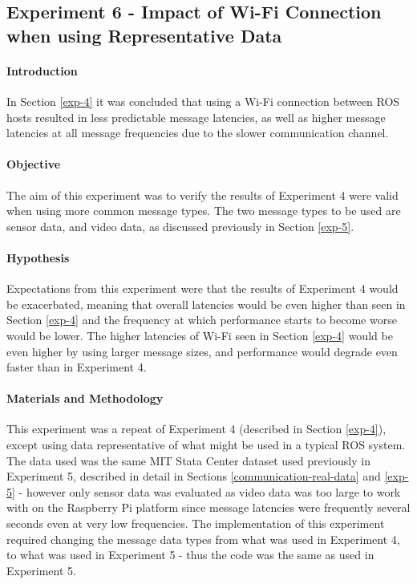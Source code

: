 \documentclass[../dissertation.tex]{subfiles}
\begin{document}
\subsection{Experiment 6 - Impact of Wi-Fi Connection when using Representative Data}
\label{experiment-6}

\paragraph{Introduction} In Section \ref{exp-4} it was concluded that using a Wi-Fi connection between ROS hosts resulted in less predictable message latencies, as well as higher message latencies at all message frequencies due to the slower communication channel.

\paragraph{Objective} The aim of this experiment was to verify the results of Experiment 4 were valid when using more common message types. The two message types to be used are sensor data, and video data, as discussed previously in Section \ref{exp-5}.

\paragraph{Hypothesis} Expectations from this experiment were that the results of Experiment 4 would be exacerbated, meaning that overall latencies would be even higher than seen in Section \ref{exp-4} and the frequency at which performance starts to become worse would be lower. The higher latencies of Wi-Fi seen in Section \ref{exp-4} would be even higher by using larger message sizes, and performance would degrade even faster than in Experiment 4.

\paragraph{Materials and Methodology} This experiment was a repeat of Experiment 4 (described in Section \ref{exp-4}), except using data representative of what might be used in a typical ROS system. The data used was the same MIT Stata Center dataset used previously in Experiment 5, described in detail in Sections \ref{communication-real-data} and \ref{exp-5} - however only sensor data was evaluated as video data was too large to work with on the Raspberry Pi platform since message latencies were frequently several seconds even at very low frequencies. The implementation of this experiment required changing the message data types from what was used in Experiment 4, to what was used in Experiment 5 - thus the code was the same as used in Experiment 5\cite{Experiment5ROSbagCode}.
\end{document}
